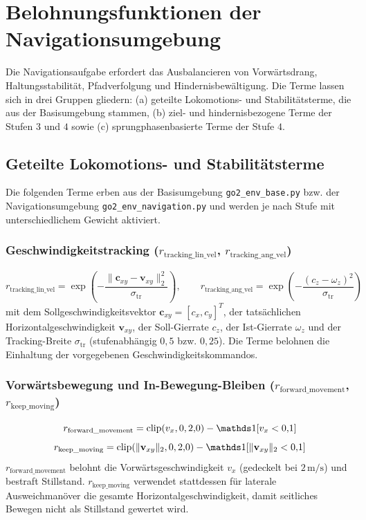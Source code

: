 \section{Belohnungsfunktionen der Navigationsumgebung}

Die Navigationsaufgabe erfordert das Ausbalancieren von Vorwärtsdrang, Haltungsstabilität, Pfadverfolgung und Hindernisbewältigung. Die Terme lassen sich in drei Gruppen gliedern: (a) geteilte Lokomotions- und Stabilitätsterme, die aus der Basisumgebung stammen, (b) ziel- und hindernisbezogene Terme der Stufen $3$ und $4$ sowie (c) sprungphasenbasierte Terme der Stufe $4$.

\subsection{Geteilte Lokomotions- und Stabilitätsterme}

Die folgenden Terme erben aus der Basisumgebung \texttt{go2\_env\_base.py} bzw. der Navigationsumgebung \texttt{go2\_env\_navigation.py} und werden je nach Stufe mit unterschiedlichem Gewicht aktiviert.

\subsubsection{Geschwindigkeitstracking ($r_{\text{tracking\_lin\_vel}}$, $r_{\text{tracking\_ang\_vel}}$)}
\begin{equation}\label{eq:nav_tracking}
r_{\text{tracking\_lin\_vel}} = \exp\!\left(-\frac{\lVert \mathbf{c}_{xy} - \mathbf{v}_{xy}\rVert_2^2}{\sigma_{\text{tr}}}\right), \qquad
r_{\text{tracking\_ang\_vel}} = \exp\!\left(-\frac{(c_z - \omega_z)^2}{\sigma_{\text{tr}}}\right)
\end{equation}
mit dem Sollgeschwindigkeitsvektor $\mathbf{c}_{xy}=[c_x,c_y]^T$, der tatsächlichen Horizontalgeschwindigkeit $\mathbf{v}_{xy}$, der Soll-Gierrate $c_z$, der Ist-Gierrate $\omega_z$ und der Tracking-Breite $\sigma_{\text{tr}}$ (stufenabhängig $0{,}5$ bzw. $0{,}25$). Die Terme belohnen die Einhaltung der vorgegebenen Geschwindigkeitskommandos.

\subsubsection{Vorwärtsbewegung und In-Bewegung-Bleiben ($r_{\text{forward\_movement}}$, $r_{\text{keep\_moving}}$)}
\begin{equation}\label{eq:nav_forward}
r_{\text{forward\_movement}} = \operatorname{clip}(v_x, 0, 2{,}0) - \ind[v_x < 0{,}1]
\end{equation}
\begin{equation}\label{eq:nav_keep_moving}
r_{\text{keep\_moving}} = \operatorname{clip}\!\left(\lVert \mathbf{v}_{xy}\rVert_2, 0, 2{,}0\right) - \ind\!\left[\lVert \mathbf{v}_{xy}\rVert_2 < 0{,}1\right]
\end{equation}
$r_{\text{forward\_movement}}$ belohnt die Vorwärtsgeschwindigkeit $v_x$ (gedeckelt bei $2\,\text{m/s}$) und bestraft Stillstand. $r_{\text{keep\_moving}}$ verwendet stattdessen für laterale Ausweichmanöver die gesamte Horizontalgeschwindigkeit, damit seitliches Bewegen nicht als Stillstand gewertet wird.

